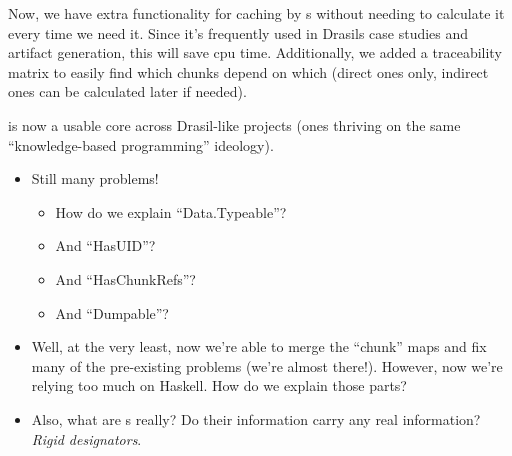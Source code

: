 
Now, we have extra functionality for caching by \TypeRep{}s without needing to
calculate it every time we need it. Since it's frequently used in Drasils case
studies and artifact generation, this will save \acs{cpu} time. Additionally, we
added a traceability matrix to easily find which chunks depend on which (direct
ones only, indirect ones can be calculated later if needed).


\ChunkDB{} is now a usable core across Drasil-like projects (ones thriving on
the same ``knowledge-based programming'' ideology).



\begin{itemize}

      \item Still many problems!
            \begin{itemize}

                  \item How do we explain ``Data.Typeable''?

                  \item And ``HasUID''?

                  \item And ``HasChunkRefs''?

                  \item And ``Dumpable''?

            \end{itemize}

      \item Well, at the very least, now we're able to merge the ``chunk'' maps
            and fix many of the pre-existing problems (we're almost there!).
            However, now we're relying too much on Haskell. How do we explain
            those parts?

      \item Also, what are \UID{}s really? Do their information carry any real
            information? \textit{Rigid designators}.

\end{itemize}

